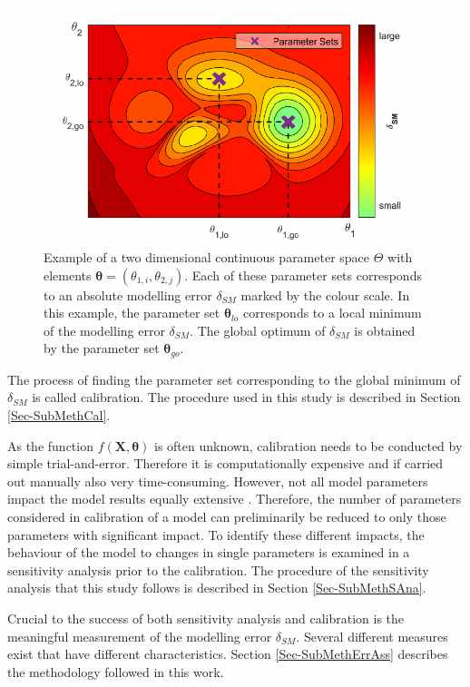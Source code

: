 \begin{figure}[h]
    \centering
    \includegraphics{./img/Fig-ParamSpaceEx.pdf}
    \caption{Example of a two dimensional continuous parameter space $\Theta$ with elements $\bm{\theta} = \left(\theta_{1,i}, \theta_{2,j}\right)$. Each of these parameter sets corresponds to an absolute modelling error $\delta_{SM}$ marked by the colour scale. In this example, the parameter set $\bm{\theta}_{lo}$ corresponds to a local minimum of the modelling error $\delta_{SM}$. The global optimum of $\delta_{SM}$ is obtained by the parameter set $\bm{\theta}_{go}$.}
    \label{Fig-ParamSpaceEx}
\end{figure}

The process of finding the parameter set corresponding to the global minimum of $\delta_{SM}$ is called calibration. 
The procedure used in this study is described in Section \ref{Sec-SubMethCal}. 

As the function $f(\bm{X},\bm{\theta})$ is often unknown, calibration needs to be conducted by simple trial-and-error. 
Therefore it is computationally expensive and if carried out manually also very time-consuming. 
However, not all model parameters impact the model results equally extensive \parencite{Duan.1993}. 
Therefore, the number of parameters considered in calibration of a model can preliminarily be reduced to only those parameters with significant impact. 
To identify these different impacts, the behaviour of the model to changes in single parameters is examined in a sensitivity analysis prior to the calibration. 
The procedure of the sensitivity analysis that this study follows is described in Section \ref{Sec-SubMethSAna}. 

Crucial to the success of both sensitivity analysis and calibration is the meaningful measurement of the modelling error $\delta_{SM}$. 
Several different measures exist that have different characteristics. 
Section \ref{Sec-SubMethErrAss} describes the methodology followed in this work.

